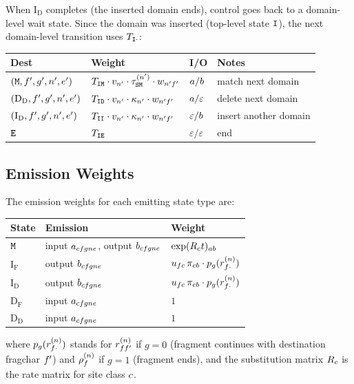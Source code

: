 When $\mathrm{I_D}$ completes (the inserted domain ends), control goes back to a
domain-level wait state.
Since the domain was inserted (top-level state ${\tt I}$), the next domain-level transition
uses $T_{{\tt I}\cdot}$:
\begin{center}
\renewcommand{\arraystretch}{1.3}
\begin{tabular}{llll}
\hline
Dest & Weight & I/O & Notes \\
\hline
$({\tt M}, f', g', n', e')$ &
  $T_{{\tt I}{\tt M}} \cdot v_{n'} \cdot
   \tau^{(n')}_{{\tt S}{\tt M}} \cdot w_{n'f'}$ &
  $a / b$ &
  match next domain \\
$(\mathrm{D_D}, f', g', n', e')$ &
  $T_{{\tt I}{\tt D}} \cdot v_{n'} \cdot
   \kappa_{n'} \cdot w_{n'f'}$ &
  $a / \varepsilon$ &
  delete next domain \\
$(\mathrm{I_D}, f', g', n', e')$ &
  $T_{{\tt I}{\tt I}} \cdot v_{n'} \cdot
   \kappa_{n'} \cdot w_{n'f'}$ &
  $\varepsilon / b$ &
  insert another domain \\
${\tt E}$ &
  $T_{{\tt I}{\tt E}}$ &
  $\varepsilon / \varepsilon$ &
  end \\
\hline
\end{tabular}
\end{center}


\subsection{Emission Weights}
\label{sec:wfst-emissions}

The emission weights for each emitting state type are:

\begin{center}
\renewcommand{\arraystretch}{1.4}
\begin{tabular}{lll}
\hline
State & Emission & Weight \\
\hline
${\tt M}$ & input $a_{cf gn e}$, output $b_{cf gn e}$ &
  $\exp(R_c t)_{ab}$ \\
$\mathrm{I_F}$ & output $b_{cf gn e}$ &
  $u_{fc}\, \pi_{cb} \cdot p_g(r^{(n)}_{f\cdot})$ \\
$\mathrm{I_D}$ & output $b_{cf gn e}$ &
  $u_{fc}\, \pi_{cb} \cdot p_g(r^{(n)}_{f\cdot})$ \\
$\mathrm{D_F}$ & input $a_{cf gn e}$ &
  $1$ \\
$\mathrm{D_D}$ & input $a_{cf gn e}$ &
  $1$ \\
\hline
\end{tabular}
\end{center}
where $p_g(r^{(n)}_{f\cdot})$ stands for $r^{(n)}_{ff'}$
if $g=0$ (fragment continues with destination fragchar $f'$) and
$\rho^{(n)}_f$ if $g=1$
(fragment ends), and the substitution matrix $R_c$ is the rate matrix for site class $c$.

